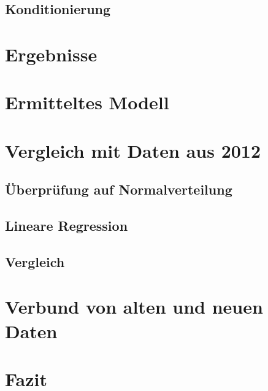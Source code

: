 \subsection{Konditionierung}

\section{Ergebnisse}
\section{Ermitteltes Modell}

\section{Vergleich mit Daten aus 2012}
\subsection{Überprüfung auf Normalverteilung}
\subsection{Lineare Regression}
\subsection{Vergleich}

\section{Verbund von alten und neuen Daten}

\section{Fazit}

